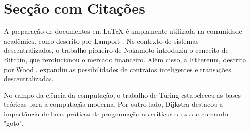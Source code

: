 \newpage
\thispagestyle{otherpages}
\section{Secção com Citações}
A preparação de documentos em \LaTeX{} é amplamente utilizada na comunidade acadêmica, como descrito por Lamport \cite{lamport1994latex}. No contexto de sistemas descentralizados, o trabalho pioneiro de Nakamoto \cite{satoshi2008bitcoin} introduziu o conceito de Bitcoin, que revolucionou o mercado financeiro. Além disso, a Ethereum, descrita por Wood \cite{clark2015ethereum}, expandiu as possibilidades de contratos inteligentes e transações descentralizadas.

No campo da ciência da computação, o trabalho de Turing \cite{turing1936computable} estabeleceu as bases teóricas para a computação moderna. Por outro lado, Dijkstra \cite{dijkstra1968goto} destacou a importância de boas práticas de programação ao criticar o uso do comando "goto".

